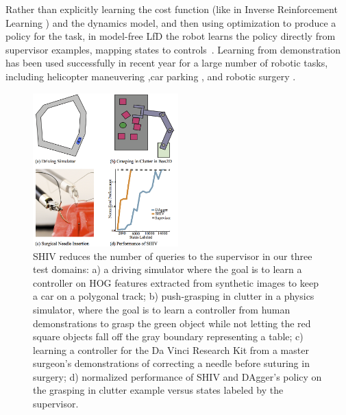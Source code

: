 \documentclass[10pt, conference]{ieeeconf}      %
\begin{document}
Rather than explicitly learning the cost function (like in Inverse Reinforcement Learning \cite{ng2000algorithms}) and the dynamics model, and then using optimization to produce a policy for the task, in model-free LfD the robot learns the policy directly from supervisor examples, mapping states to controls~\cite{argall2009survey}. Learning from demonstration has been used successfully in recent year for a large number of robotic tasks, including helicopter maneuvering \cite{abbeel2007application},car parking \cite{abbeel2008apprenticeship},  and robotic surgery \cite{van2010superhuman}. 

 


\begin{figure}[ht]
\centering
   
\includegraphics[width=0.5\textwidth]{figures/teaser.pdf}
\caption{ \footnotesize
SHIV  reduces the number of queries to the supervisor in our three test domains: a) a driving simulator where the goal is to learn a controller on HOG features extracted from synthetic images to keep a car on a polygonal track; b) push-grasping in clutter in a physics simulator, where the goal is to learn a controller from human demonstrations to grasp the green object while not letting the red square objects fall off the gray boundary representing a table; c) learning a controller for the Da Vinci Research Kit from a master surgeon's demonstrations of correcting a needle before suturing in surgery; d) normalized performance of SHIV and DAgger's policy on the grasping in clutter example versus states labeled by the supervisor.
}
\vspace*{-20pt}
\label{fig:teaser}
\end{figure}
\end{document}

